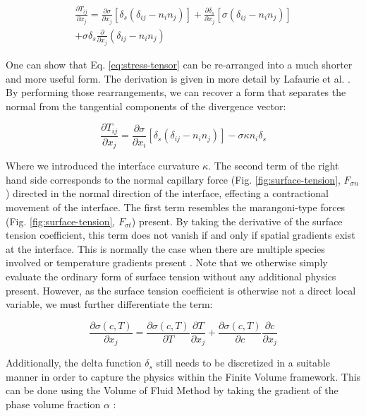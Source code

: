 \documentclass[conference,final,a4paper]{IEEEtran}
\begin{document}
\begin{multline} \label{eq:stress-tensor}
    \frac{\partial T_{ij}}{\partial x_j} = \frac{\partial \sigma}{\partial x_j} [\delta_s(\delta_{ij} - n_i n_j)] + \frac{\partial \delta_s}{\partial x_j} [\sigma (\delta_{ij} - n_i n_j)] \\ + \sigma \delta_s \frac{\partial}{\partial x_j} (\delta_{ij} - n_i n_j)
\end{multline}

One can show that Eq. \ref{eq:stress-tensor} can be re-arranged into a much shorter and more useful form. The derivation is given in more detail by Lafaurie et al. \cite{lafaurieModellingMergingFragmentation1994}. By performing those rearrangements, we can recover a form that separates the normal from the tangential components of the divergence vector:

\begin{equation}
\label{eq:divergence-capillarystress}
    \frac{\partial T_{ij}}{\partial x_j} = \frac{\partial \sigma}{\partial x_i} [\delta_s(\delta_{ij} - n_i n_j)] - \sigma \kappa n_i \delta_s 
\end{equation}

Where we introduced the interface curvature $\kappa$. The second term of the right hand side corresponds to the normal capillary force (Fig. \ref{fig:surface-tension}, $F_{\sigma n}$) directed in the normal direction of the interface, effecting a contractional movement of the interface. The first term resembles the marangoni-type forces (Fig. \ref{fig:surface-tension}, $F_{\sigma t}$) present. By taking the derivative of the surface tension coefficient, this term does not vanish if and only if spatial gradients exist at the interface. This is normally the case when there are multiple species involved or temperature gradients present \cite{j.straubThermokapillareGrenzflachenkonvektionGasblasen1990}. Note that we otherwise simply evaluate the ordinary form of surface tension without any additional physics present. However, as the surface tension coefficient is otherwise not a direct local variable, we must further differentiate the term:

\begin{equation}
    \frac{\partial \sigma(c,T)}{\partial x_j} = \frac{\partial \sigma(c,T)}{\partial T} \frac{\partial T}{\partial x_j} + \frac{\partial \sigma(c,T)}{\partial c} \frac{\partial c}{\partial x_j}
    \label{eq:sigmadiff}
\end{equation}

Additionally, the delta function $\delta_s$ still needs to be discretized in a suitable manner in order to capture the physics within the Finite Volume framework. This can be done using the Volume of Fluid Method by taking the gradient of the phase volume fraction $\alpha$ \cite{gueyffierVolumeofFluidInterfaceTracking1999,hirtVolumeFluidVOF1981}:
\end{document}

